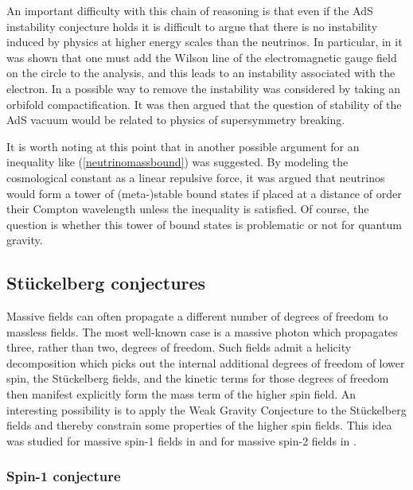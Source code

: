 \documentclass[11pt,a4paper]{article}
\numberwithin{equation}{section}
\numberwithin{table}{section}\setlength{\multlinegap}{25pt}
\begin{document}
{An important difficulty with this chain of reasoning is that even if the AdS instability conjecture holds it is difficult to argue that there is no instability induced by physics at higher energy scales than the neutrinos. In particular, in \cite{Hamada:2017yji} it was shown that one must add the Wilson line of the electromagnetic gauge field on the circle to the analysis, and this leads to an instability associated with the electron.  In \cite{Gonzalo:2018tpb,Gonzalo:2018dxi} a possible way to remove the instability was considered by taking an orbifold compactification. It was then argued that the question of stability of the AdS vacuum would be related to physics of supersymmetry breaking. 

It is worth noting at this point that in \cite{Lust:2017wrl} another possible argument for an inequality like (\ref{neutrinomassbound}) was suggested. By modeling the cosmological constant as a linear repulsive force, it was argued that neutrinos would form a tower of (meta-)stable bound states if placed at a distance of order their Compton wavelength unless the inequality is satisfied. Of course, the question is whether this tower of bound states is problematic or not for quantum gravity.

\subsection{St\"uckelberg conjectures}
\label{sec:stu1con}

Massive fields can often propagate a different number of degrees of freedom to massless fields. The most well-known case is a massive photon which propagates three, rather than two, degrees of freedom. Such fields admit a helicity decomposition which picks out the internal additional degrees of freedom of lower spin, the St\"uckelberg fields, and the kinetic terms for those degrees of freedom then manifest explicitly form the mass term of the higher spin field. An interesting possibility is to apply the Weak Gravity Conjecture to the St\"uckelberg fields and thereby constrain some properties of the higher spin fields. This idea was studied for massive spin-1 fields in \cite{Reece:2018zvv} and for massive spin-2 fields in \cite{Klaewer:2018yxi,deRham:2018dqm}.

\subsubsection{Spin-1 conjecture}

}
\end{document}
